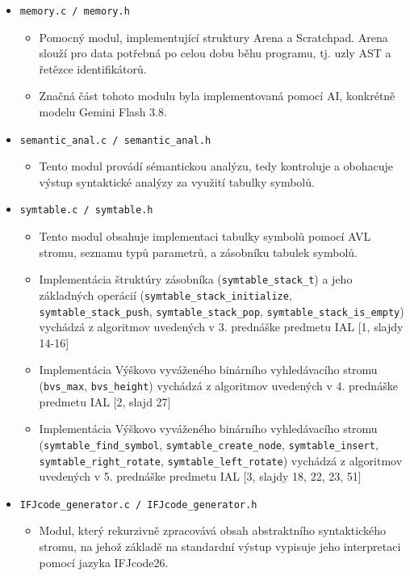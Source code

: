 {\begin{itemize}
\begin{itemize}
    \end{itemize}
    \newpage
    \item \verb|memory.c / memory.h|
    \begin{itemize}
        \item Pomocný modul, implementující struktury Arena a Scratchpad. Arena slouží pro data potřebná po celou dobu běhu programu, tj. uzly AST a řetězce identifikátorů.
        \item Značná část tohoto modulu byla implementovaná pomocí AI, konkrétně modelu Gemini Flash 3.8.
    \end{itemize}
    \item \verb|semantic_anal.c / semantic_anal.h|
    \begin{itemize}
        \item Tento modul provádí sémantickou analýzu, tedy kontroluje a obohacuje výstup syntaktické analýzy za využití tabulky symbolů.
    \end{itemize}
    \item \verb|symtable.c / symtable.h|
    \begin{itemize}
        \item Tento modul obsahuje implementaci tabulky symbolů pomocí AVL stromu, seznamu typů parametrů, a zásobníku tabulek symbolů. 
        \item Implementácia štruktúry zásobníka (\verb|symtable_stack_t|) a jeho základných operácií (\verb|symtable_stack_initialize|, \verb|symtable_stack_push|, \verb|symtable_stack_pop|, \verb|symtable_stack_is_empty|) vychádzá z algoritmov uvedených v 3. prednáške predmetu IAL [1, slajdy 14-16]
        \item Implementácia Výškovo vyváženého binárního vyhledávacího stromu (\verb|bvs_max|, \verb|bvs_height|) vychádzá z algoritmov uvedených v 4. prednáške predmetu IAL [2, slajd 27]
        \item Implementácia Výškovo vyváženého binárního vyhledávacího stromu (\verb|symtable_find_symbol|, \verb|symtable_create_node|, \verb|symtable_insert|, \verb|symtable_right_rotate|, \verb|symtable_left_rotate|) vychádzá z algoritmov uvedených v 5. prednáške predmetu IAL [3, slajdy 18, 22, 23, 51]
    \end{itemize}
    \item \verb|IFJcode_generator.c / IFJcode_generator.h|
    \begin{itemize}
        \item Modul, který rekurzivně zpracovává obsah abstraktního syntaktického stromu, na jehož základě na standardní výstup vypisuje jeho interpretaci pomocí jazyka IFJcode26.

\end{itemize}
\end{itemize}}
